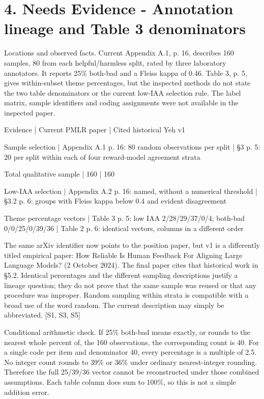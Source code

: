\documentclass[10pt]{article}
\begin{document}
\section*{4. Needs Evidence - Annotation lineage and Table 3 denominators}
Locations and observed facts. Current Appendix A.1, p. 16, describes 160 samples, 80 from each helpful/harmless split, rated by three laboratory annotators. It reports 25\% both-bad and a Fleiss kappa of 0.46. Table 3, p. 5, gives within-subset theme percentages, but the inspected methods do not state the two table denominators or the current low-IAA selection rule. The label matrix, sample identifiers and coding assignments were not available in the inspected paper.\par
Evidence | Current PMLR paper | Cited historical Yeh v1\par
Sample selection | Appendix A.1 p. 16: 80 random observations per split | §3 p. 5: 20 per split within each of four reward-model agreement strata\par
Total qualitative sample | 160 | 160\par
Low-IAA selection | Appendix A.2 p. 16: named, without a numerical threshold | §3.2 p. 6: groups with Fleiss kappa below 0.4 and evident disagreement\par
Theme percentage vectors | Table 3 p. 5: low IAA 2/28/29/37/0/4; both-bad 0/0/25/0/39/36 | Table 2 p. 6: identical vectors, columns in a different order\par
The same arXiv identifier now points to the position paper, but v1 is a differently titled empirical paper: How Reliable Is Human Feedback For Aligning Large Language Models? (2 October 2024). The final paper cites that historical work in §5.2. Identical percentages and the different sampling descriptions justify a lineage question; they do not prove that the same sample was reused or that any procedure was improper. Random sampling within strata is compatible with a broad use of the word random. The current description may simply be abbreviated. [S1, S3, S5]\par
Conditional arithmetic check. If 25\% both-bad means exactly, or rounds to the nearest whole percent of, the 160 observations, the corresponding count is 40. For a single code per item and denominator 40, every percentage is a multiple of 2.5. No integer count rounds to 39\% or 36\% under ordinary nearest-integer rounding. Therefore the full 25/39/36 vector cannot be reconstructed under those combined assumptions. Each table column does sum to 100\%, so this is not a simple addition error.\par
\end{document}
